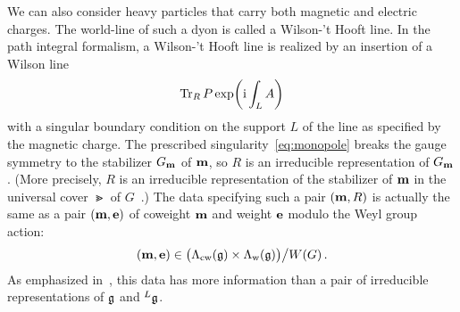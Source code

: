 We can also consider heavy particles that carry both magnetic and
electric charges.  The world-line of such a dyon is called a Wilson-'t
Hooft line.  In the path integral formalism, a Wilson-'t Hooft line
is realized by an insertion of a Wilson line
\begin{equation}
  \label{eq:Wilson}
  \mathop{\mathrm{Tr}}\nolimits_R P\exp\biggl(\mathrm{i}\int_L A\biggr)
\end{equation}
with a singular boundary condition on the support $L$ of the line as
specified by the magnetic charge.  The prescribed
singularity~\eqref{eq:monopole} breaks the gauge symmetry to the
stabilizer $G_{\mathbf{m}}$ of $\mathbf{m}$, so $R$ is an irreducible
representation of $G_{\mathbf{m}}$.  (More precisely, $R$ is an
irreducible representation of the stabilizer of $\mathbf{m}$ in the
universal cover $\Gt$ of $G$~\cite{Kapustin:2005py}.)
The data specifying such a pair $(\mathbf{m},R)$ is actually the same as
a pair $(\mathbf{m}, \mathbf{e})$ of coweight $\mathbf{m}$ and weight
$\mathbf{e}$ modulo the Weyl group action:
\begin{equation}
  (\mathbf{m}, \mathbf{e})
  \in
  \bigl(\Lambda_{\mathrm{cw}}(\mathfrak{g}) \times \Lambda_{\mathrm{w}}(\mathfrak{g})\bigr)\big/W(G) \,.
\end{equation}
As emphasized in~\cite{Kapustin:2005py}, this data has more information than
a pair of irreducible representations of $\mathfrak{g}$ and ${}^L\mathfrak{g}$.


